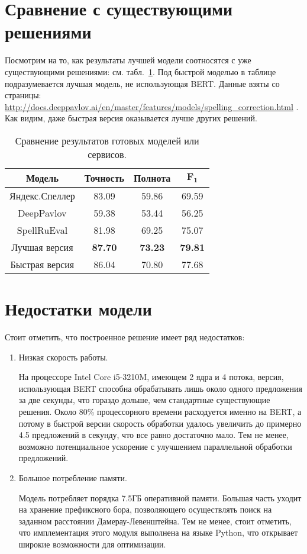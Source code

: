\section{Сравнение с существующими решениями}

Посмотрим на то, как результаты лучшей модели соотносятся с уже существующими решениями: см. табл.~\ref{table:production_comparison}. Под быстрой моделью в таблице подразумевается лучшая модель, не использующая BERT. Данные взяты со страницы: \url{http://docs.deeppavlov.ai/en/master/features/models/spelling_correction.html} \cite{DeepPavlovTable}.  Как видим, даже быстрая версия оказывается лучше других решений.

\begin{table}[h]
	\begin{center}
		\caption{Сравнение результатов готовых моделей или сервисов.}
		\label{table:production_comparison}
		\begin{tabular}{|c|c|c|c|}
			\hline
			\textbf{Модель} & \textbf{Точность} & \textbf{Полнота} & $\boldsymbol{F_1}$  \\
			\hline
			Яндекс.Спеллер & 83.09  & 59.86 & 69.59 \\
			DeepPavlov & 59.38  & 53.44 & 56.25 \\
			SpellRuEval & 81.98  & 69.25 & 75.07 \\
			Лучшая версия & \textbf{87.70}  & \textbf{73.23} & \textbf{79.81} \\
			Быстрая версия & 86.04  & 70.80 & 77.68 \\
			\hline
		\end{tabular}
	\end{center}
\end{table}

\section{Недостатки модели}

Стоит отметить, что построенное решение имеет ряд недостатков:
\begin{enumerate}
	\item Низкая скорость работы. 
	
	На процессоре Intel Core i5-3210M, имеющем 2 ядра и 4 потока, версия, использующая BERT способна обрабатывать лишь около одного предложения за две секунды, что гораздо дольше, чем стандартные существующие решения. Около 80\% процессорного времени расходуется именно на BERT, а потому в быстрой версии скорость обработки удалось увеличить до примерно 4.5 предложений в секунду, что все равно достаточно мало. Тем не менее, возможно потенциальное ускорение с улучшением параллельной обработки предложений.
	
	\item Большое потребление памяти. 
	
	Модель потребляет порядка 7.5ГБ оперативной памяти. Большая часть уходит на хранение префиксного бора, позволяющего осуществлять поиск на заданном расстоянии Дамерау-Левенштейна. Тем не менее, стоит отметить, что имплементация этого модуля выполнена на языке Python, что открывает широкие возможности для оптимизации.
\end{enumerate}
